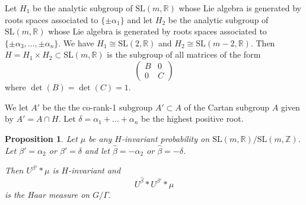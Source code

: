 \documentclass[10pt,reqno]{amsart}
\theoremstyle{Theorem}
\newtheorem{proposition}[theorem]{Proposition}
\theoremstyle{definition}
\theoremstyle{remark}
\newcommand{\R}{\mathbb {R}}
\newcommand{\Z}{\mathbb {Z}}
\newcommand{\Sl}{\mathrm{SL}}
\begin{document}
Let $H_1 $  be the analytic subgroup of $\Sl(m,\R)$ whose Lie algebra is generated by roots spaces associated to  $\{\pm \alpha_1\}$ and let  $H_2$ be the analytic subgroup of $\Sl(m,\R)$ whose Lie algebra is  generated by roots spaces associated to $\{\pm \alpha_3, \dots, \pm \alpha_n\}$.  We have  $H_1 \cong \Sl(2,\R)$ and $H_2 \cong \Sl(m-2, \R)$.  Then $H = H_1\times H_2\subset \Sl(m,\R)$ is the subgroup of all matrices of the form
$$\left(\begin{array}{cc}B& 0 \\0 & C\end{array}\right)$$
where $\det(B) = \det(C) =1$.

 We let $A'$ be the  the co-rank-1 subgroup $A'\subset A$  of the Cartan subgroup $A$  given by $A'= A\cap H$.
Let $\delta= \alpha_1 + \dots + \alpha_n$ be the highest positive  root.
\begin{proposition}
\label{proposition:averaging}
Let $\mu$ be any $H$-invariant probability on $\Sl(m,\R)/\Sl(m,\Z)$.  Let $\beta'= \alpha_2$ or $\beta' = \delta$ and let $\hat \beta = - \alpha_2$ or $\hat \beta =- \delta$.

Then $ U^{\beta'}\ast \mu$ is $H$-invariant and  $$U^{\hat \beta}\ast  U^{\beta'}\ast \mu$$ is the Haar measure on $G/\Gamma$.
\end{proposition}
\end{document}
